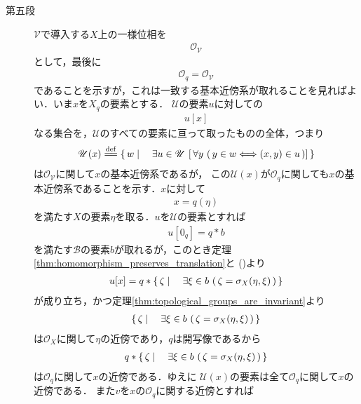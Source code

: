 \begin{sketch}
\begin{description}
			
			\item[第五段]
				$\mathscr{V}$で導入する$X$上の一様位相を
				\begin{align}
					\mathscr{O}_{\mathscr{V}}
				\end{align}
				として，最後に
				\begin{align}
					\mathscr{O}_q = \mathscr{O}_{\mathscr{V}}
				\end{align}
				であることを示すが，これは一致する基本近傍系が取れることを見ればよい．いま$x$を$X_q$の要素とする．
				$\mathscr{U}$の要素$u$に対しての
				\begin{align}
					u[x]
				\end{align}
				なる集合を，$\mathscr{U}$のすべての要素に亘って取ったものの全体，つまり
				\begin{align}
					\mathscr{U}(x) \defeq 
					\Set{w}{\exists u \in \mathscr{U}\, 
					\left[\, \forall y\, \left(\, y \in w \Longleftrightarrow (x,y) \in u\, \right) \right]}
				\end{align}
				は$\mathscr{O}_{\mathscr{V}}$に関して$x$の基本近傍系であるが，
				この$\mathscr{U}(x)$が$\mathscr{O}_q$に関しても$x$の基本近傍系であることを示す．$x$に対して
				\begin{align}
					x = q(\eta)
				\end{align}
				を満たす$X$の要素$\eta$を取る．$u$を$\mathscr{U}$の要素とすれば
				\begin{align}
					u[0_q] = q \ast b
				\end{align}
				を満たす$\mathscr{B}$の要素$b$が取れるが，このとき定理\ref{thm:homomorphism_preserves_translation}と
				()より
				\begin{align}
					u[x] = q \ast \left\{\, \zeta \mid \quad \exists \xi \in b\, 
					\left(\, \zeta = \sigma_X(\eta,\xi)\, \right)\, \right\}
				\end{align}
				が成り立ち，かつ定理\ref{thm:topological_groups_are_invariant}より
				\begin{align}
					\left\{\, \zeta \mid \quad \exists \xi \in b\, \left(\, \zeta = \sigma_X(\eta,\xi)\, \right)\, \right\}
				\end{align}
				は$\mathscr{O}_X$に関して$\eta$の近傍であり，$q$は開写像であるから
				\begin{align}
					q \ast \left\{\, \zeta \mid \quad \exists \xi \in b\, \left(\, \zeta = \sigma_X(\eta,\xi)\, \right)\, \right\}
				\end{align}
				は$\mathscr{O}_q$に関して$x$の近傍である．ゆえに
				$\mathscr{U}(x)$の要素は全て$\mathscr{O}_q$に関して$x$の近傍である．
				また$v$を$x$の$\mathscr{O}_q$に関する近傍とすれば

\end{description}
\end{sketch}
